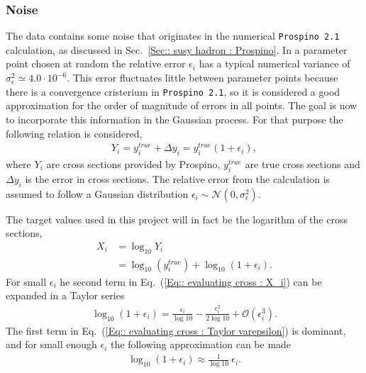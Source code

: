 \documentclass[twoside,english]{uiofysmaster}
\begin{document}
{\subsubsection{Noise}\label{Sec:: evaluating cross : Noise in dataset}

The data contains some noise that originates in the numerical \verb|Prospino 2.1| calculation, as discussed in Sec.~\ref{Sec:: susy hadron : Prospino}. In a parameter point chosen at random the relative error $\epsilon_i$ has a typical numerical variance of $\sigma^2_{\epsilon} \simeq 4.0 \cdot 10^{-6}$. This error fluctuates little between parameter points because there is a convergence cristerium in \verb|Prospino 2.1|, so it is considered a good approximation for the order of magnitude of errors in all points. The goal is now to incorporate this information in the Gaussian process. For that purpose the following relation is considered,
\begin{align}\label{Eq:: cross section w/ error}
Y_i = y^{true}_i + \Delta y_i = y_i^{true}(1 + \epsilon_i),
\end{align}
where $Y_i$ are cross sections provided by Prospino, $y_i^{true}$ are true cross sections and $\Delta y_i$ is the error in cross sections. The relative error from the calculation is assumed to follow a Gaussian distribution $\epsilon_i \sim \mathcal{N}(0, \sigma_{\epsilon}^2)$. 

The target values used in this project will in fact be the logarithm of the cross sections, 
\begin{align}
X_i &= \log_{10} Y_i \nonumber \\
&= \log_{10}(y_i^{true})  + \log_{10}(1 + \epsilon_i).\label{Eq:: evaluating cross : X_i}
\end{align}
For small $\epsilon_i$ he second term in Eq.~(\ref{Eq:: evaluating cross : X_i}) can be expanded in a Taylor series
\begin{align}\label{Eq:: evaluating cross : Taylor varepsilon}
\log_{10}(1 + \epsilon_i) = \frac{\epsilon_i}{\log 10} - \frac{\epsilon_i^2}{2 \log 10} + \mathcal{O}(\epsilon_i^3). 
\end{align} 
The first term in Eq.~(\ref{Eq:: evaluating cross : Taylor varepsilon}) is dominant, and for small enough $\epsilon_i$ the following approximation can be made
\begin{align}
\log_{10}(1 + \epsilon_i) \approx \frac{1}{\log 10} ~\epsilon_i.
\end{align}

}
\end{document}
